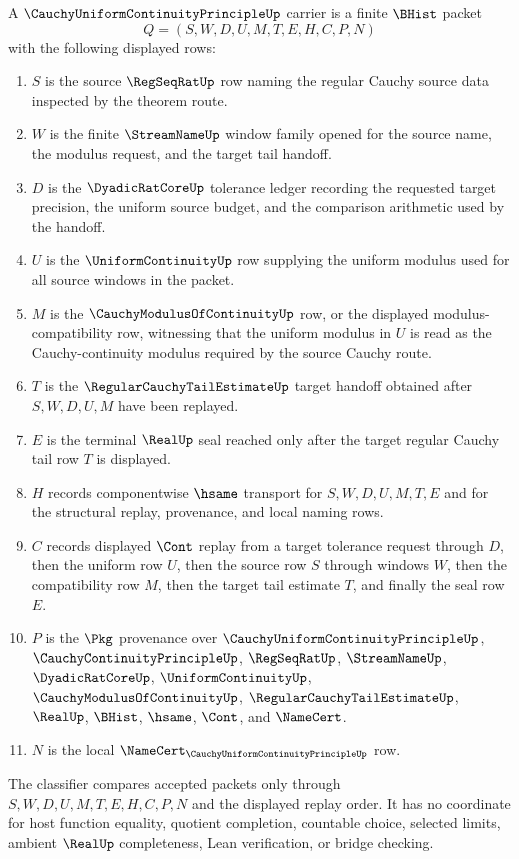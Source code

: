 \begin{definition}
\label{def:cauchy-uniform-continuity-principle-carrier}
A $\CauchyUniformContinuityPrincipleUp$ carrier is a finite $\BHist$ packet
$$
Q=(S,W,D,U,M,T,E,H,C,P,N)
$$
with the following displayed rows:
\begin{enumerate}
\item $S$ is the source $\RegSeqRatUp$ row naming the regular Cauchy source data inspected by the theorem route.
\item $W$ is the finite $\StreamNameUp$ window family opened for the source name, the modulus request, and the target tail handoff.
\item $D$ is the $\DyadicRatCoreUp$ tolerance ledger recording the requested target precision, the uniform source budget, and the comparison arithmetic used by the handoff.
\item $U$ is the $\UniformContinuityUp$ row supplying the uniform modulus used for all source windows in the packet.
\item $M$ is the $\CauchyModulusOfContinuityUp$ row, or the displayed modulus-compatibility row, witnessing that the uniform modulus in $U$ is read as the Cauchy-continuity modulus required by the source Cauchy route.
\item $T$ is the $\RegularCauchyTailEstimateUp$ target handoff obtained after $S,W,D,U,M$ have been replayed.
\item $E$ is the terminal $\RealUp$ seal reached only after the target regular Cauchy tail row $T$ is displayed.
\item $H$ records componentwise $\hsame$ transport for $S,W,D,U,M,T,E$ and for the structural replay, provenance, and local naming rows.
\item $C$ records displayed $\Cont$ replay from a target tolerance request through $D$, then the uniform row $U$, then the source row $S$ through windows $W$, then the compatibility row $M$, then the target tail estimate $T$, and finally the seal row $E$.
\item $P$ is the $\Pkg$ provenance over $\CauchyUniformContinuityPrincipleUp$, $\CauchyContinuityPrincipleUp$, $\RegSeqRatUp$, $\StreamNameUp$, $\DyadicRatCoreUp$, $\UniformContinuityUp$, $\CauchyModulusOfContinuityUp$, $\RegularCauchyTailEstimateUp$, $\RealUp$, $\BHist$, $\hsame$, $\Cont$, and $\NameCert$.
\item $N$ is the local $\NameCert_{\CauchyUniformContinuityPrincipleUp}$ row.
\end{enumerate}
The classifier compares accepted packets only through $S,W,D,U,M,T,E,H,C,P,N$ and the displayed replay order. It has no coordinate for host function equality, quotient completion, countable choice, selected limits, ambient $\RealUp$ completeness, Lean verification, or bridge checking.
\end{definition}

